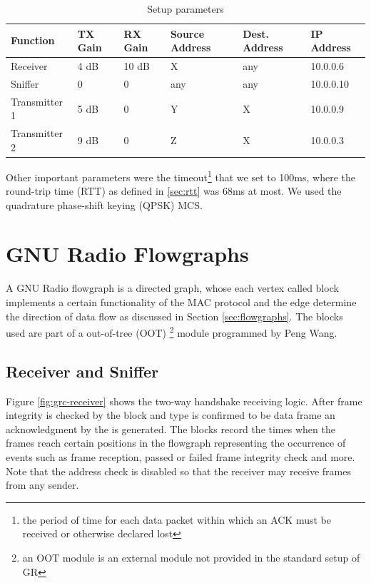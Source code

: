 \begin{table}[t]
	\label{tab:measurement-parameters}
	\begin{center}
		\begin{tabular}{p{2.5cm}p{2cm}p{2cm}p{1.5cm}p{1.5cm}p{2cm}}
			\toprule
			Function & TX Gain & RX Gain & Source Address & Dest. Address & IP Address\\
			\midrule
			Receiver 		& 4 dB 	& 10 dB & X 	& any	& 10.0.0.6\\
			Sniffer 		& 0 	& 0 	& any 	& any	& 10.0.0.10 \\
			Transmitter 1 	& 5 dB 	& 0 	& Y 	& 	X 	& 10.0.0.9 \\
			Transmitter 2	& 9 dB 	& 0 	& Z 	& 	X 	& 10.0.0.3 \\
			\bottomrule	
		\end{tabular}\caption{Setup parameters}
	\end{center}
\end{table}

Other important parameters were the timeout\footnote{the period of time for each data packet within which an ACK must be received or otherwise declared lost} that we set to 100ms, where the round-trip time (RTT) as defined in \ref{sec:rtt} was 68ms at most. We used the quadrature phase-shift keying (QPSK) MCS.

\section{GNU Radio Flowgraphs}    

A GNU Radio flowgraph is a directed graph, whose each vertex called block implements a certain functionality of the MAC protocol and the edge determine the direction of data flow as discussed in Section \ref{sec:flowgraphs}. The blocks used are part of a out-of-tree (OOT) \footnote{an OOT module is an external module not provided in the standard setup of GR} module programmed by Peng Wang. 

\subsection{Receiver and Sniffer}

Figure \ref{fig:grc-receiver} shows the two-way handshake receiving logic. After frame integrity is checked by the  block and type is confirmed to be data frame an acknowledgment by the  is generated. The  blocks record the times when the frames reach certain positions in the flowgraph representing the occurrence of events such as frame reception, passed or failed frame integrity check and more. Note that the address check is disabled so that the receiver may receive frames from any sender.

